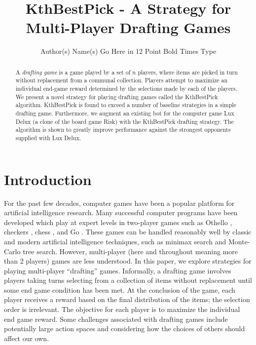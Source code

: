 \documentclass[letterpaper]{article}
\title{KthBestPick - A Strategy for Multi-Player Drafting Games}
\author{Author(s) Name(s) Go Here in 12 Point Bold Times Type}
\numberwithin{equation}{section}
\numberwithin{theorem}{section}
\numberwithin{lemma}{section}
\numberwithin{df}{section}
\begin{document}
\maketitle

\begin{abstract}
A \emph{drafting game} is a game played by a set of $n$ players, where items are picked in turn without replacement from a communal collection.  Players attempt to maximize an individual end-game reward determined by the selections made by each of the players.  We present a novel strategy for playing drafting games called the KthBestPick algorithm.  KthBestPick is found to exceed a number of baseline strategies in a simple drafting game.  Furthermore, we augment an existing bot for the computer game Lux Delux (a clone of the board game Risk) with the KthBestPick drafting strategy. The algorithm is shown to greatly improve performance against the strongest opponents supplied with Lux Delux.
\end{abstract}

\section{Introduction}


For the past few decades, computer games have been a popular platform for artificial intelligence research.  Many successful computer programs have been developed which play at expert levels in two-player games such as Othello \cite{Othello}, 
checkers \cite{Chinook}, chess \cite{DeepBlue}, 
and Go \cite{ComputerGo}.  These games can be handled reasonably well by classic and modern artificial intelligence techniques, such as minimax search and Monte-Carlo tree search.  However, multi-player (here and throughout meaning more than 2 players) games are less understood.  In this paper, we explore strategies for playing multi-player ``drafting'' games.  Informally, a drafting game involves players taking turns selecting from a collection of items without replacement until some end game condition has been met.  At the conclusion of the game, each player receives a reward based on the final distribution of the items; the selection order is irrelevant.  The objective for each player is to maximize the individual end game reward.  Some challenges associated with drafting games include potentially large action spaces and considering how the choices of others should affect our own.
\end{document}

